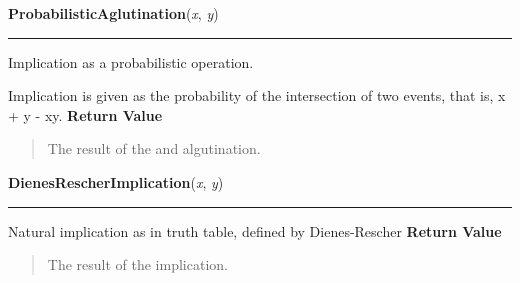     \label{peach:fuzzy:norms:ProbabilisticAglutination}

    \vspace{0.5ex}

\hspace{.8\funcindent}\begin{boxedminipage}{\funcwidth}

    \raggedright \textbf{ProbabilisticAglutination}(\textit{x}, \textit{y})

    \vspace{-1.5ex}

    \rule{\textwidth}{0.5\fboxrule}
\setlength{\parskip}{2ex}

Implication as a probabilistic operation.

Implication is given as the probability of the intersection of two events,
that is, x + y - xy.
\setlength{\parskip}{1ex}
      \textbf{Return Value}
    \vspace{-1ex}

      \begin{quote}

The result of the and algutination.
      \end{quote}

    \end{boxedminipage}

    \label{peach:fuzzy:norms:DienesRescherImplication}

    \vspace{0.5ex}

\hspace{.8\funcindent}\begin{boxedminipage}{\funcwidth}

    \raggedright \textbf{DienesRescherImplication}(\textit{x}, \textit{y})

    \vspace{-1.5ex}

    \rule{\textwidth}{0.5\fboxrule}
\setlength{\parskip}{2ex}

Natural implication as in truth table, defined by Dienes-Rescher
\setlength{\parskip}{1ex}
      \textbf{Return Value}
    \vspace{-1ex}

      \begin{quote}

The result of the implication.
      \end{quote}

    \end{boxedminipage}

